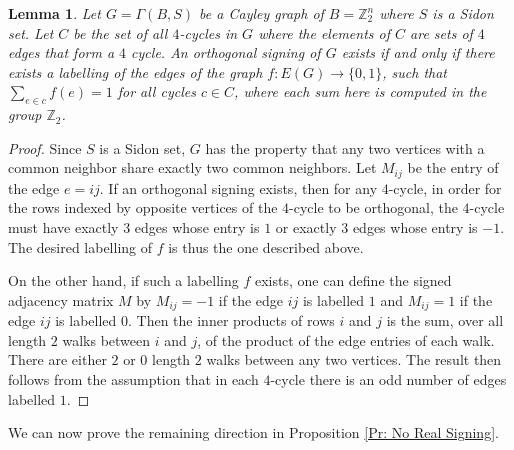 \documentclass[11pt]{article}
\newtheorem{lemma}[theo]{Lemma}
\begin{document}
\begin{lemma}
\label{Lm: cycles}
Let $G = \Gamma(B, S)$ be a Cayley graph of $B=\mathbb{Z}_{2}^{n}$ 
where $S$ is a Sidon set. Let $C$ be the set  of all $4$-cycles 
in $G$ where the elements of $C$ are sets of $4$ edges that form a $4$ cycle. 
An orthogonal signing of $G$ exists if and only if 
there exists a labelling of the edges of the graph 
$f: E(G) \xrightarrow{} \{0, 1\}$, 
such that $\sum_{e \in c} f(e) = 1$ for all cycles $c \in C$, where
each sum here is computed in the group $\mathbb{Z}_2$.
\end{lemma}
\begin{proof}
Since $S$ is a Sidon set, $G$ has the property that any two vertices 
with a common neighbor share exactly two common neighbors. 
Let $M_{ij}$ be the entry of the edge $e = ij$. 
If an orthogonal signing exists, then for any $4$-cycle, in order for 
the rows indexed by opposite vertices of the $4$-cycle to be orthogonal, 
the $4$-cycle must have exactly $3$ edges whose entry is $1$ or exactly 
$3$ edges whose entry is $-1$. The desired labelling of $f$ is thus the
one described above.

On the other hand, if such a labelling $f$ exists, one can define the signed 
adjacency matrix $M$ by $M_{ij} = -1$ if the edge $ij$ is labelled $1$ 
and $M_{ij} = 1$ if the edge $ij$ is labelled $0$. 
Then the inner products of rows $i$ and $j$ is the sum, over all 
length $2$ walks between $i$ and $j$, of the product of the edge 
entries of each walk. There are either $2$ or $0$ length 
$2$ walks between any two vertices. The result 
then follows from the assumption that in each $4$-cycle there is
an odd number of edges labelled $1$.
\end{proof}

We can now prove the remaining direction in Proposition \ref{Pr: No Real Signing}.
\end{document}
